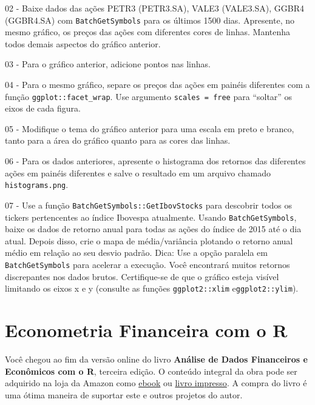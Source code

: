 \documentclass[
  11pt,
]{book}
\newenvironment{pleasebuyit}
{\begin{noteblock}
		
	} {\end{noteblock}}
\begin{document}
02 -
Baixe dados das ações PETR3 (PETR3.SA), VALE3 (VALE3.SA), GGBR4 (GGBR4.SA) com \texttt{BatchGetSymbols} para os últimos 1500 dias. Apresente, no mesmo gráfico, os preços das ações com diferentes cores de linhas. Mantenha todos demais aspectos do gráfico anterior.

03 -
Para o gráfico anterior, adicione pontos nas linhas.

04 -
Para o mesmo gráfico, separe os preços das ações em painéis diferentes com a função \texttt{ggplot::facet\_wrap}. Use argumento \texttt{scales\ =\ \textquotesingle{}free\textquotesingle{}} para ``soltar'' os eixos de cada figura.

05 -
Modifique o tema do gráfico anterior para uma escala em preto e branco, tanto para a área do gráfico quanto para as cores das linhas.

06 -
Para os dados anteriores, apresente o histograma dos retornos das diferentes ações em painéis diferentes e salve o resultado em um arquivo chamado \texttt{\textquotesingle{}histograms.png\textquotesingle{}}.

07 -
Use a função \texttt{BatchGetSymbols::GetIbovStocks} para descobrir todos os tickers pertencentes ao índice Ibovespa atualmente. Usando \texttt{BatchGetSymbols}, baixe os dados de retorno anual para todas as ações do índice de 2015 até o dia atual. Depois disso, crie o mapa de média/variância plotando o retorno anual médio em relação ao seu desvio padrão. Dica: Use a opção paralela em \texttt{BatchGetSymbols} para acelerar a execução. Você encontrará muitos retornos discrepantes nos dados brutos. Certifique-se de que o gráfico esteja visível limitando os eixos x e y (consulte as funções \texttt{ggplot2::xlim} e\texttt{ggplot2::ylim}).

\hypertarget{modelos}{%
\chapter{Econometria Financeira com o R}\label{modelos}}

\begin{pleasebuyit}
Você chegou ao fim da versão online do livro \textbf{Análise de Dados
Financeiros e Econômicos com o R}, terceira edição. O conteúdo integral
da obra pode ser adquirido na loja da Amazon como
\href{https://www.amazon.com.br/dp/B08WNC27ZY}{ebook} ou
\href{https://www.amazon.com/dp/B08WP8CCDB}{livro impresso}. A compra do
livro é uma ótima maneira de suportar este e outros projetos do autor.
\end{pleasebuyit}
\end{document}
